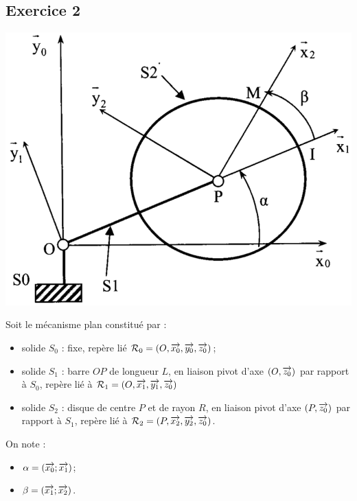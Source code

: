 \documentclass[10pt,oneside]{article}
\begin{document}
\subsection*{Exercice 2}
\setcounter{subparagraph}{0}
\begin{minipage}[c]{.55\linewidth}
\begin{center}
\includegraphics[width=.95\textwidth]{png/fig2}
\end{center}
\end{minipage}\hfill
\begin{minipage}[c]{.4\linewidth}
Soit le mécanisme plan constitué par :
\begin{itemize}
\item solide $S_0$ : fixe, repère lié $\mathcal{R}_0=\left( O,\overrightarrow{x_0},\overrightarrow{y_0},\overrightarrow{z_0}\right)$;
\item solide $S_1$ : barre $OP$ de longueur $L$, en liaison pivot d’axe $(O,\overrightarrow{z_0})$ par rapport à $S_0$, repère lié  
à $\mathcal{R}_1=\left( O,\overrightarrow{x_1},\overrightarrow{y_1},\overrightarrow{z_0}\right)$
\item solide $S_2$ : disque de centre $P$ et de rayon $R$, en liaison pivot d’axe $(P,\overrightarrow{z_0})$ par rapport à $S_1$, repère lié à
$\mathcal{R}_2=\left( P,\overrightarrow{x_2},\overrightarrow{y_2},\overrightarrow{z_0}\right)$.
\end{itemize}
On note :
\begin{itemize}
\item $\alpha = \left(\overrightarrow{x_0};\overrightarrow{x_1}\right)$;
\item $\beta = \left(\overrightarrow{x_1};\overrightarrow{x_2}\right)$.
\end{itemize}

\end{minipage}
\end{document}
